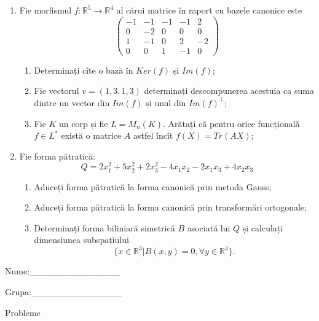 \documentclass{article}
\begin{document}
\begin{enumerate}
 \item Fie morfismul $f:\mathbb{R}^5 \to \mathbb{R}^4$ al cărui matrice în raport cu bazele canonice este
$$\begin{pmatrix}
-1&-1&-1&-1&2\\
0&-2&0&0&0\\
1&-1&0&2&-2\\
0&0&1&-1&0
\end{pmatrix}$$

\begin{enumerate}
\item Determinați cîte o bază în $Ker(f)$ și $Im(f)$;
\item Fie vectorul $v=(1,3,1,3)$ determinați descompunerea acestuia ca suma dintre un vector din $Im(f)$ și unul din $Im(f)^\perp$;
\item Fie $K$ un corp și fie $L=M_n(K)$. Arătați că pentru orice funcțională $f \in L^*$ există o matrice $A$ astfel încît $f(X)=Tr(AX)$;
\end{enumerate}
\item Fie forma pătratică:
$$Q= 2x_1^2+5x_2^2+2x_3^2-4x_1x_2-2x_1x_3+4x_2x_3$$

\begin{enumerate}
\item Aduceți forma pătratică la forma canonică prin metoda Gauss;
\item Aduceți forma pătratică la forma canonică prin transformări ortogonale;
\item Determinați forma biliniară simetrică $B$ asociată lui $Q$ și calculați dimensiunea subspațiului
$$\{x \in \mathbb{R}^3 | B(x,y)=0,\forall y \in \mathbb{R}^3\}.$$

\end{enumerate}
\end{enumerate}
\newpage
\begin{flushright}
Nume:\_\_\_\_\_\_\_\_\_\_\_\_\_\_
 
 
Grupa:\_\_\_\_\_\_\_\_\_\_\_\_\_\_
\end{flushright}
\begin{center}
\vspace{2cm}
{\Large Probleme}
\vspace{2cm}
\end{center}
\end{document}
